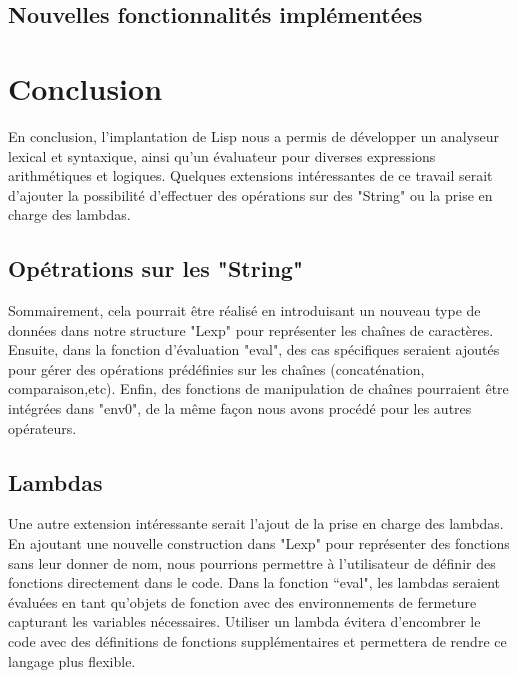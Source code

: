 \documentclass{article}
\begin{document}
\subsection*{Nouvelles fonctionnalités implémentées}
\section{Conclusion}
En conclusion, l'implantation de Lisp nous a permis de développer un analyseur lexical et syntaxique, ainsi 
qu'un évaluateur pour diverses expressions arithmétiques et logiques. Quelques extensions intéressantes de 
ce travail serait d'ajouter la possibilité d'effectuer des opérations sur des "String" ou la prise en charge 
des lambdas.

\subsection {Opétrations sur les "String"}
Sommairement, cela pourrait être réalisé en introduisant un nouveau type de données dans notre structure "Lexp" 
pour représenter les chaînes de caractères. Ensuite, dans la fonction d'évaluation "eval", des cas spécifiques 
seraient ajoutés pour gérer des opérations prédéfinies sur les chaînes (concaténation, comparaison,etc). Enfin, 
des fonctions de manipulation de chaînes pourraient être intégrées dans "env0", de la même façon nous avons procédé 
pour les autres opérateurs.

\subsection {Lambdas}
Une autre extension intéressante serait l'ajout de la prise en charge des lambdas. En ajoutant une nouvelle construction 
dans "Lexp" pour représenter des fonctions sans leur donner de nom, nous pourrions permettre à l'utilisateur de définir 
des fonctions directement dans le code. Dans la fonction “eval", les lambdas seraient évaluées en tant qu'objets de fonction 
avec des environnements de fermeture capturant les variables nécessaires. Utiliser un lambda évitera d'encombrer le code avec 
des définitions de fonctions supplémentaires et permettera de rendre ce langage plus flexible.
\end{document}
